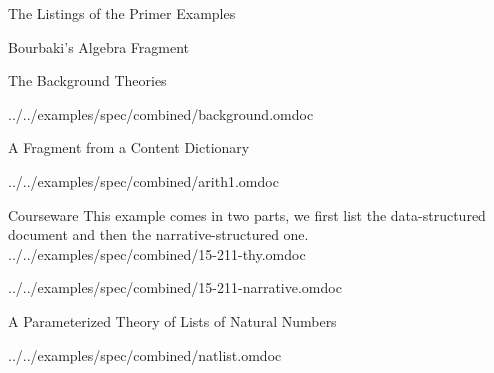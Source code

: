 \begin{tchapter}[id=examples]{The Listings of the Primer Examples}
\begin{tsection}[id=examples:algebra]{Bourbaki's Algebra  Fragment}
\begin{tsubsection}[id=examples:background]{The Background Theories}

  {../../examples/spec/combined/background.omdoc}
\end{tsubsection}
\end{tsection}

\begin{tsection}[id=examples:arith1]{A Fragment from a Content Dictionary}

  {../../examples/spec/combined/arith1.omdoc}
\end{tsection}

\begin{tsection}[id=examples:courseware]{Courseware}
This example comes in two parts, we first list the data-structured document and
then the narrative-structured one.
 {../../examples/spec/combined/15-211-thy.omdoc}


  {../../examples/spec/combined/15-211-narrative.omdoc}
\end{tsection}

\begin{tsection}[id=examples:natlist,short=Lists of Natural Numbers]{A Parameterized Theory of Lists of Natural Numbers}

  {../../examples/spec/combined/natlist.omdoc}
\end{tsection}
\end{tchapter}

